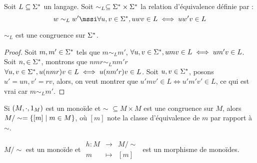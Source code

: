 \begin{definition}
	Soit $L \subseteq \Sigma^{*}$ un langage. Soit $\sim_L \subseteq \Sigma^{*} \times \Sigma^{*}$ la relation d'équivalence définie par :
	$$ w \sim_L w' \mssi \forall u,v \in \mots, uwv \in L \iff u w' v \in L$$
\end{definition}

\begin{prop}
	$\sim_L$ est une congruence sur $\Sigma^{*}$.
\end{prop}

\begin{proof}
	Soit $m, m' \in \Sigma^{*}$ tels que $m \sim_L m'$, \cad $\forall u,v \in \Sigma^{*}, umv \in L \iff um'v \in L$.
	Soit $n, \in \Sigma^{*}$, montrons que $nmr \sim_L nm'r$ \cad $\forall u, v \in \Sigma^{*}, u(nmr)v \in L \iff u(nm'r)v \in L$.
	Soit $u,v \in \Sigma^{*}$, posons $u' = un, v' = rv$, alors, on veut montrer que $u'mv' \in L \iff u'm'v' \in L$, 
	ce qui est vrai car $m \sim_L m'$.
\end{proof}


\begin{prop}
	Si $(M, \cdot, 1_M)$ est un monoïde et $\sim$ $\subseteq M \times M$ est une congruence sur $M$, alors $M/\sim = \left\{[m] \mid m \in M\right\}$, où $[m]$ note la classe d'équivalence de $m$ par rapport à $\sim$.

	$M/\sim$ est un monoïde et $ \begin{array}{rcl}
			h : M & \to     & M/\sim \\
			m     & \mapsto & [m]
		\end{array} $ est un morphisme de monoïdes.
\end{prop}

